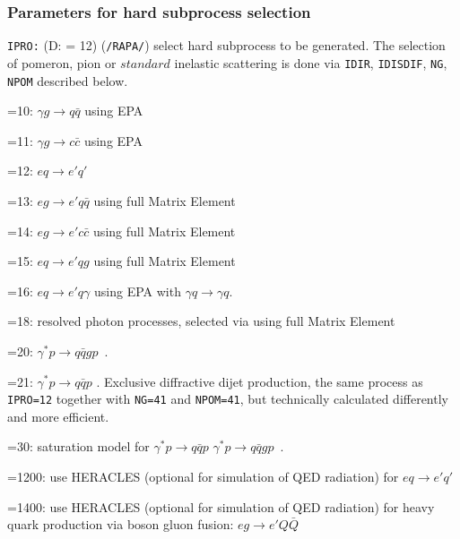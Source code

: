 \documentclass[10pt]{article} \usepackage{dina4}
\newcommand{\deflab}[1]{#1\hfil}%
\newenvironment{defl}[1]%
  {\begin{list}{}{\settowidth{\labelwidth}{#1}%
  \setlength{\leftmargin}{\labelwidth}%
  \addtolength{\leftmargin}{\labelsep}%
  \setlength{\itemsep}{0pt plus 1pt}
  \setlength{\parsep}{0pt plus 1pt}
  \setlength{\topsep}{0pt plus 1pt}
  \setlength{\partopsep}{0pt plus 1pt}
  \setlength{\parskip}{2mm plus 1mm minus 1mm}
  \let\makelabel\deflab}}%
  {\end{list}}
\begin{document}
\subsubsection{Parameters for hard subprocess selection}
\begin{defl}{123456789012345}
\item[{\tt IPRO:}] (D: = 12) (\verb+/RAPA/+)
                    select hard subprocess to be generated. The 
                    selection of pomeron, pion or $standard$ inelastic 
                    scattering is done via 
                    \verb+IDIR+, \verb+IDISDIF+, \verb+NG+, \verb+NPOM+
                    described below. 
\item[{\it         }]
                 =10:   $\gamma g \rightarrow q \bar{q}$
                        using EPA
\item[{\it         }]
                 =11:   $\gamma g \rightarrow c \bar{c}$
                        using EPA
\item[{\it         }]
                 =12:   $e q \rightarrow e' q'$
\item[{\it         }]
                 =13:   $e g \rightarrow e' q \bar{q}$
                        using full Matrix Element
\item[{\it         }]
                 =14:   $e  g \rightarrow e' c \bar{c}$
                        using full Matrix Element
\item[{\it         }]
                 =15:   $e  q \rightarrow e' q g$
                        using full Matrix Element
\item[{\it         }]
                 =16:   $e  q \rightarrow e' q \gamma$
                        using EPA with $\gamma q \to \gamma q$.
\item[{\it         }]
                 =18:   resolved photon processes, selected via 
                        using full Matrix Element
\item[{\it         }]
                 =20:   $\gamma^* p \to q \bar{q} g p$~\cite{Bartels_qqg}.
\item[{\it         }]
                 =21:   $\gamma^* p \to q \bar{q} p$
		            \cite{Bartels_jets,Bartels_asym}.
		            Exclusive diffractive
		            dijet production, the same process as \verb+IPRO=12+
				together with \verb+NG=41+ and \verb+NPOM=41+, but
				technically calculated differently and more efficient. 
				
\item[{\it         }]
                 =30: saturation model for   $\gamma^* p \to q \bar{q} p$
		     $\gamma^* p \to q \bar{q} g p$~\cite{satrap}.
\item[{\it         }]
               =1200:   use HERACLES \cite{HERACLESa,HERACLESb} 
                        (optional for 
                        simulation of QED radiation) for 
                        $e q \rightarrow e' q'$
\item[{\it         }]
               =1400:   use HERACLES \cite{HERACLESa,HERACLESb} 
                        (optional for 
                        simulation of QED radiation) for heavy quark production 
				via boson gluon fusion: 
                        $e g \rightarrow e' Q \bar{Q}$ 


\end{defl}
\end{document}
